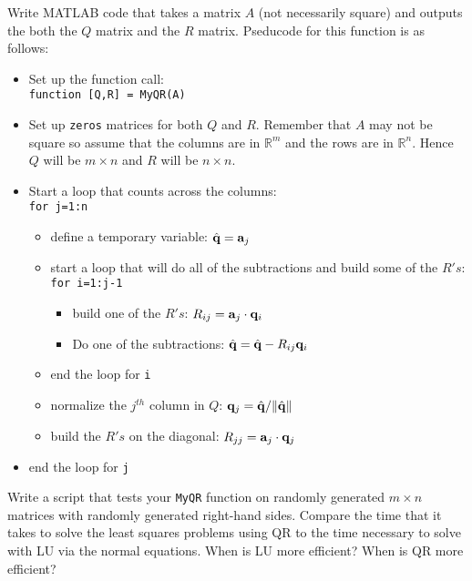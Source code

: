 \begin{problem}
    Write MATLAB code that takes a matrix $A$ (not necessarily square) and outputs the
    both the $Q$ matrix and the $R$ matrix. Pseducode for this function is as follows:
    \begin{itemize}
        \item Set up the function call:\\ \texttt{function [Q,R] = MyQR(A)}
        \item Set up \texttt{zeros} matrices for both $Q$ and $R$.  Remember that $A$ may
            not be square so assume that the columns are in $\mathbb{R}^m$ and the rows
            are in $\mathbb{R}^n$.  Hence $Q$ will be $m \times n$ and $R$ will be $n
            \times n$.
        \item Start a loop that counts across the columns:\\ \texttt{for j=1:n}
            \begin{itemize}
                \item define a temporary variable: $\hat{{\bf q}} = {\bf a}_j$
                \item start a loop that will do all of the subtractions and build some of
                    the $R's$:\\ \texttt{for i=1:j-1}
                    \begin{itemize}
                        \item build one of the $R's$: $R_{ij} = {\bf a}_j \cdot {\bf q}_i$
                        \item Do one of the subtractions: $\hat{{\bf q}} = \hat{{\bf q}} - R_{ij} {\bf q}_i$
                    \end{itemize}
                \item end the loop for \texttt{i}
                \item normalize the $j^{th}$ column in $Q$: ${\bf q}_j = \hat{{\bf q}} / \| \hat{{\bf q}} \|$
                \item build the $R's$ on the diagonal: $R_{jj} = {\bf a}_j \cdot {\bf q}_j$
            \end{itemize}
        \item end the loop for \texttt{j}
    \end{itemize}
\end{problem}

\begin{problem}
    Write a script that tests your \texttt{MyQR} function on randomly generated $m×n$ matrices
    with randomly generated right-hand sides. Compare the time that it takes to solve the
    least squares problems using QR to the time necessary to solve with LU via the normal
    equations. When is LU more efficient? When is QR more efficient?
\end{problem}

